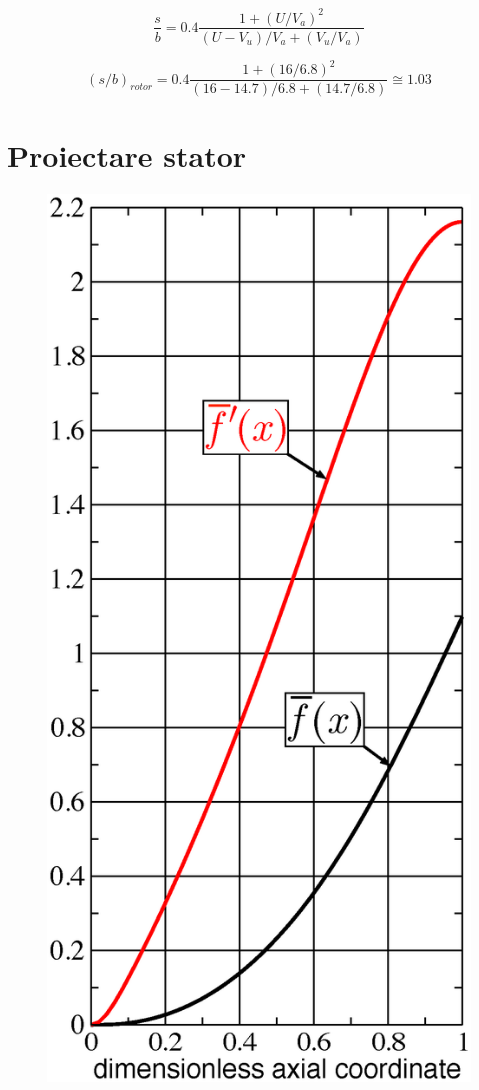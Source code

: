 \begin{equation}
\frac{s}{b} = 0.4 \frac{1 + (U / V_a)^2 } {(U - V_u) / V_a + (V_u / V_a)}
\end{equation}

\begin{equation}
(s/b)_{rotor} = 0.4 \frac{1 + (16 / 6.8)^2 } {(16 - 14.7) / 6.8 + (14.7 / 6.8)} \cong 1.03
\end{equation}

\clearpage


\section{Proiectare stator}

\begin{figure}[h]
	\centering
	\includegraphics[scale=0.5]{figures/stator_initial_blade.eps}

\end{figure}
